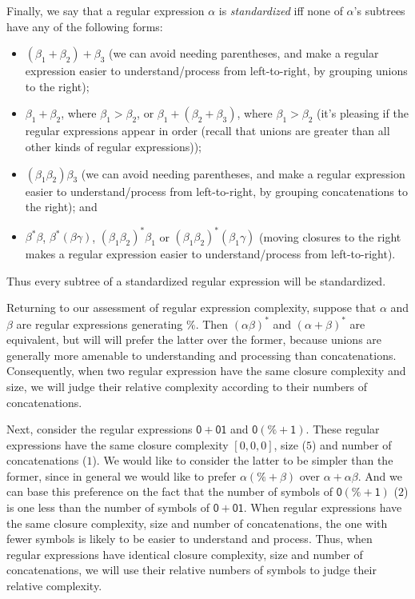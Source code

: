 Finally, we say that a regular expression $\alpha$ is \emph{standardized}
%
%
iff none of $\alpha$'s subtrees have any of the following forms:
\begin{itemize}
\item $(\beta_1+\beta_2)+\beta_3$ (we can avoid needing parentheses,
  and make a regular expression easier to understand/process from
  left-to-right, by grouping unions to the right);

\item $\beta_1+\beta_2$, where $\beta_1>\beta_2$, or
  $\beta_1+(\beta_2+\beta_3)$, where $\beta_1>\beta_2$ (it's pleasing
  if the regular expressions appear in order (recall that unions
  are greater than all other kinds of regular expressions));

\item $(\beta_1\beta_2)\beta_3$ (we can avoid needing parentheses, and
  make a regular expression easier to understand/process from
  left-to-right, by grouping concatenations to the right); and

\item $\beta^*\beta$, $\beta^*(\beta\gamma)$,
  $(\beta_1\beta_2)^*\beta_1$ or $(\beta_1\beta_2)^*(\beta_1\gamma)$
  (moving closures to the right makes a regular expression easier to
  understand/process from left-to-right).
\end{itemize}
Thus every subtree of a standardized regular expression will be standardized.

Returning to our assessment of regular expression complexity, suppose
that $\alpha$ and $\beta$ are regular expressions generating $\%$.
Then $(\alpha\beta)^*$ and $(\alpha+\beta)^*$ are equivalent, but will
will prefer the latter over the former, because unions are generally
more amenable to understanding and processing than concatenations.
Consequently, when two regular expression have the same closure
complexity and size, we will judge their relative complexity
according to their numbers of concatenations.

Next, consider the regular expressions $\mathsf{0 + 01}$ and
$\mathsf{0(\% + 1)}$.  These regular expressions have the same closure
complexity $[0,0,0]$, size ($5$) and number of concatenations ($1$).
We would like to consider the latter to be simpler than the former,
since in general we would like to prefer $\alpha(\%+\beta)$ over
$\alpha + \alpha\beta$.  And we can base this preference on the fact
that the number of symbols of $\mathsf{0(\% + 1)}$ ($2$) is one less
than the number of symbols of $\mathsf{0 + 01}$.  When regular
expressions have the same closure complexity, size and number of
concatenations, the one with fewer symbols is likely to be easier to
understand and process.  Thus, when regular expressions have
identical closure complexity, size and number of concatenations, we
will use their relative numbers of symbols to judge their relative
complexity.

